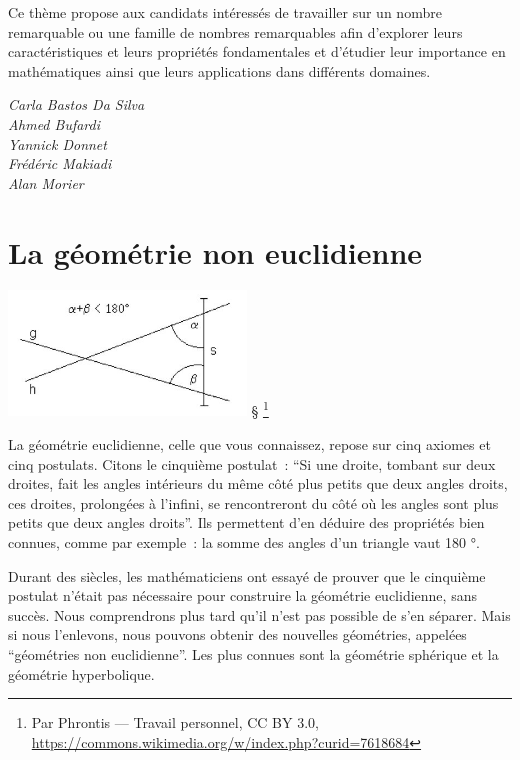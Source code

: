 \documentclass[
  10pt,
  french,
  a5paper,
  openany]{book}
\newenvironment{signature}{\begin{flushright}}{\end{flushright}}
\begin{document}
Ce thème propose aux candidats intéressés de travailler sur un nombre remarquable ou une famille de nombres remarquables afin d'explorer leurs caractéristiques et leurs propriétés fondamentales et d'étudier leur importance en mathématiques ainsi que leurs applications dans différents domaines.

\begin{signature}
\emph{Carla Bastos Da Silva}\\
\emph{Ahmed Bufardi}\\
\emph{Yannick Donnet}\\
\emph{Frédéric Makiadi}\\
\emph{Alan Morier}

\end{signature}

\hypertarget{la-guxe9omuxe9trie-non-euclidienne}{%
\chapter{La géométrie non euclidienne}\label{la-guxe9omuxe9trie-non-euclidienne}}


\begin{center}
\includegraphics[width=\textwidth,height=9em]{images/la-geometrie-non-euclidienne-1.jpg} §
\footnote{Par Phrontis --- Travail personnel, CC BY 3.0, \url{https://commons.wikimedia.org/w/index.php?curid=7618684}}

\end{center}

La géométrie euclidienne, celle que vous connaissez, repose sur cinq axiomes et cinq postulats. Citons le cinquième postulat~: ``Si une droite, tombant sur deux droites, fait les angles intérieurs du même côté plus petits que deux angles droits, ces droites, prolongées à l'infini, se rencontreront du côté où les angles sont plus petits que deux angles droits''. Ils permettent d'en déduire des propriétés bien connues, comme par exemple~: la somme des angles d'un triangle vaut 180 °.

Durant des siècles, les mathématiciens ont essayé de prouver que le cinquième postulat n'était pas nécessaire pour construire la géométrie euclidienne, sans succès. Nous comprendrons plus tard qu'il n'est pas possible de s'en séparer. Mais si nous l'enlevons, nous pouvons obtenir des nouvelles géométries, appelées ``géométries non euclidienne''. Les plus connues sont la géométrie sphérique et la géométrie hyperbolique.
\end{document}
